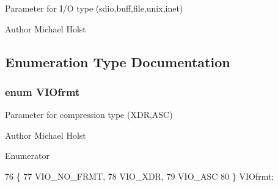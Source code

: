 Parameter for I/\+O type (sdio,buff,file,unix,inet) 

\begin{DoxyAuthor}{Author}
Michael Holst 
\end{DoxyAuthor}


\subsection{Enumeration Type Documentation}
\subsubsection[{V\+I\+Ofrmt}]{\setlength{\rightskip}{0pt plus 5cm}enum {\bf V\+I\+Ofrmt}}\label{a00028_gabfa72aea464435d52c14c43ebd5e363b}


Parameter for compression type (X\+D\+R,A\+S\+C) 

\begin{DoxyAuthor}{Author}
Michael Holst 
\end{DoxyAuthor}
\begin{Desc}
\item[Enumerator]\par
\begin{description}
\item[{\em 
V\+I\+O\+\_\+\+N\+O\+\_\+\+F\+R\+M\+T\label{a00028_ggabfa72aea464435d52c14c43ebd5e363bade52aaa65f920c341c443993f0898b73}
}]\item[{\em 
V\+I\+O\+\_\+\+X\+D\+R\label{a00028_ggabfa72aea464435d52c14c43ebd5e363ba35f912228eb6c27fc632520ae9629924}
}]\item[{\em 
V\+I\+O\+\_\+\+A\+S\+C\label{a00028_ggabfa72aea464435d52c14c43ebd5e363baec02355c47d63dead444522a814209f4}
}]\end{description}
\end{Desc}

\begin{DoxyCode}
76                      \{
77     VIO_NO_FRMT,
78     VIO_XDR,
79     VIO_ASC
80 \} VIOfrmt;
\end{DoxyCode}
